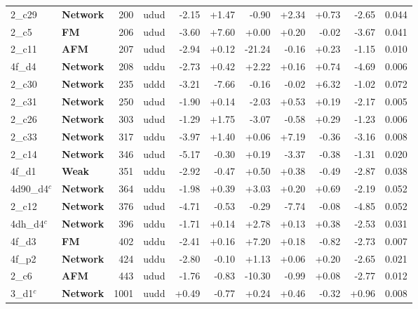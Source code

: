 {\begin{longtable}{@{\extracolsep{\fill}}llrlrrrrrrr@{}}
2\_c29 & \textcolor{famNetwork}{\textbf{Network}} & 200 & udud & -2.15 & +1.47 & -0.90 & +2.34 & +0.73 & -2.65 & 0.044 \\
2\_c5 & \textcolor{famFM}{\textbf{FM}} & 206 & udud & -3.60 & +7.60 & +0.00 & +0.20 & -0.02 & -3.67 & 0.041 \\
2\_c11 & \textcolor{famAFM}{\textbf{AFM}} & 207 & udud & -2.94 & +0.12 & -21.24 & -0.16 & +0.23 & -1.15 & 0.010 \\
4f\_d4 & \textcolor{famNetwork}{\textbf{Network}} & 208 & uddu & -2.73 & +0.42 & +2.22 & +0.16 & +0.74 & -4.69 & 0.006 \\
2\_c30 & \textcolor{famNetwork}{\textbf{Network}} & 235 & uddd & -3.21 & -7.66 & -0.16 & -0.02 & +6.32 & -1.02 & 0.072 \\
2\_c31 & \textcolor{famNetwork}{\textbf{Network}} & 250 & udud & -1.90 & +0.14 & -2.03 & +0.53 & +0.19 & -2.17 & 0.005 \\
2\_c26 & \textcolor{famNetwork}{\textbf{Network}} & 303 & udud & -1.29 & +1.75 & -3.07 & -0.58 & +0.29 & -1.23 & 0.006 \\
2\_c33 & \textcolor{famNetwork}{\textbf{Network}} & 317 & uddu & -3.97 & +1.40 & +0.06 & +7.19 & -0.36 & -3.16 & 0.008 \\
2\_c14 & \textcolor{famNetwork}{\textbf{Network}} & 346 & udud & -5.17 & -0.30 & +0.19 & -3.37 & -0.38 & -1.31 & 0.020 \\
4f\_d1 & \textcolor{famWeak}{\textbf{Weak}} & 351 & uddu & -2.92 & -0.47 & +0.50 & +0.38 & -0.49 & -2.87 & 0.038 \\
4d90\_d4$^{c}$ & \textcolor{famNetwork}{\textbf{Network}} & 364 & uddu & -1.98 & +0.39 & +3.03 & +0.20 & +0.69 & -2.19 & 0.052 \\
2\_c12 & \textcolor{famNetwork}{\textbf{Network}} & 376 & udud & -4.71 & -0.53 & -0.29 & -7.74 & -0.08 & -4.85 & 0.052 \\
4dh\_d4$^{c}$ & \textcolor{famNetwork}{\textbf{Network}} & 396 & uddu & -1.71 & +0.14 & +2.78 & +0.13 & +0.38 & -2.53 & 0.031 \\
4f\_d3 & \textcolor{famFM}{\textbf{FM}} & 402 & uddu & -2.41 & +0.16 & +7.20 & +0.18 & -0.82 & -2.73 & 0.007 \\
4f\_p2 & \textcolor{famNetwork}{\textbf{Network}} & 424 & uddu & -2.80 & -0.10 & +1.13 & +0.06 & +0.20 & -2.65 & 0.021 \\
2\_c6 & \textcolor{famAFM}{\textbf{AFM}} & 443 & udud & -1.76 & -0.83 & -10.30 & -0.99 & +0.08 & -2.77 & 0.012 \\
3\_d1$^{c}$ & \textcolor{famNetwork}{\textbf{Network}} & 1001 & uudd & +0.49 & -0.77 & +0.24 & +0.46 & -0.32 & +0.96 & 0.008 \\

\end{longtable}}
